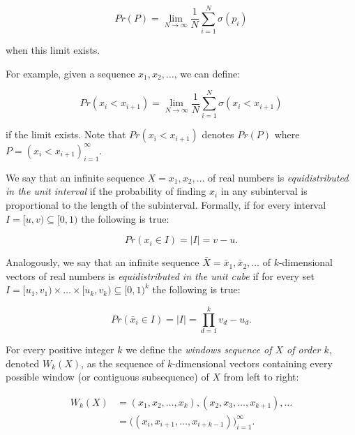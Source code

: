 \documentclass[11pt,a4paper]{tesis}
\theoremstyle{plain}
\theoremstyle{definition}
\begin{document}
\begin{equation*}
  Pr(P) = \lim_{N \to \infty} \frac{1}{N} \sum_{i = 1}^{N} \sigma(p_i)
\end{equation*}

when this limit exists.

For example, given a sequence $x_1, x_2, \dots$, we can define:

\begin{equation*}
  Pr(x_i < x_{i+1}) = \lim_{N \to \infty} \frac{1}{N} \sum_{i = 1}^{N} \sigma(x_i < x_{i+1})
\end{equation*}

if the limit exists. Note that $Pr(x_i < x_{i+1})$ denotes $Pr(P)$ where $P = (x_i < x_{i+1})_{i = 1}^{\infty}$.

We say that an infinite sequence $X = x_1, x_2, \dots$ of real numbers is \textit{equidistributed in the unit interval} if the probability of finding $x_i$ in any subinterval is proportional to the length of the subinterval. Formally, if for every interval $I = [u, v) \subseteq [0, 1)$ the following is true:

\begin{equation*}
  Pr(x_i \in I) = |I| = v - u \text{.}
\end{equation*}

Analogously, we say that an infinite sequence $\bar{X} = \bar{x}_1, \bar{x}_2, \dots$ of $k$-dimensional vectors of real numbers is \textit{equidistributed in the unit cube} if for every set $I = [u_1, v_1)  \times \dots \times [u_k, v_k) \subseteq [0, 1)^k$ the following is true:

\begin{equation*}
  Pr(\bar{x}_i \in I) = |I| = \prod_{d = 1}^{k} v_d - u_d \text{.}
\end{equation*}

For every positive integer $k$ we define the \textit{windows sequence of $X$ of order $k$}, denoted $W_k(X)$, as the sequence of $k$-dimensional vectors containing every possible window (or contiguous subsequence) of $X$ from left to right:

\begin{equation}\label{equation:windows-sequence}
  \begin{aligned}
    W_k(X) & = (x_1, x_2, \dots, x_k), (x_2, x_3, \dots, x_{k + 1}), \dots \\
             & = \big( (x_i, x_{i + 1}, \dots, x_{i + k - 1}) \big)_{i = 1}^{\infty} \text{.}
  \end{aligned}
\end{equation}
\end{document}
